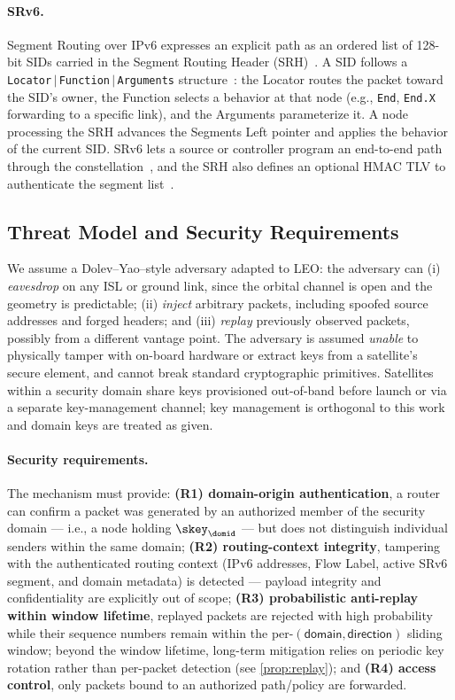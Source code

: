 \paragraph{SRv6.}
Segment Routing over IPv6 expresses an explicit path as an ordered list of
128-bit SIDs carried in the Segment Routing Header (SRH)~\cite{rfc8402,rfc8754,srsurvey}. A SID follows a \texttt{Locator$\,|\,$Function$\,|\,$Arguments}
structure~\cite{rfc8986}: the Locator routes the packet toward the SID's owner,
the Function selects a behavior at that node (e.g., \texttt{End}, \texttt{End.X}
forwarding to a specific link), and the Arguments parameterize it. A node
processing the SRH advances the Segments Left pointer and applies the behavior
of the current SID. SRv6 lets a source or controller program an end-to-end path
through the constellation~\cite{li2022,kassing2023}, and the SRH also defines an optional HMAC TLV to
authenticate the segment list~\cite{rfc8754}.

\subsection{Threat Model and Security Requirements}
\label{sec:threat}

We assume a Dolev--Yao--style adversary adapted to LEO: the adversary can (i) \emph{eavesdrop} on any ISL or ground link, since the orbital channel
is open and the geometry is predictable; (ii) \emph{inject} arbitrary packets,
including spoofed source addresses and forged headers; and (iii) \emph{replay}
previously observed packets, possibly from a different vantage point. The
adversary is assumed \emph{unable} to physically tamper with on-board hardware
or extract keys from a satellite's secure element, and cannot break standard
cryptographic primitives. Satellites within a security domain share keys
provisioned out-of-band before launch or via a separate key-management channel;
key management is orthogonal to this work and domain keys are treated as given.

\paragraph{Security requirements.}
The mechanism must provide: \textbf{(R1) domain-origin authentication}, a
router can confirm a packet was generated by an authorized member of the
security domain --- i.e., a node holding $\skey_\domid$ --- but does not
distinguish individual senders within the same domain;
\textbf{(R2) routing-context integrity},
tampering with the authenticated routing context (IPv6 addresses, Flow Label, active SRv6 segment, and domain metadata) is detected --- payload integrity and confidentiality are
explicitly out of scope; \textbf{(R3) probabilistic anti-replay within window lifetime}, replayed
packets are rejected with high probability while their sequence numbers remain within the per-$(\textsf{domain}, \textsf{direction})$ sliding window; beyond the window lifetime, long-term mitigation relies on periodic key rotation rather than per-packet detection
(see \cref{prop:replay}); and \textbf{(R4) access control}, only packets bound
to an authorized path/policy are forwarded.

